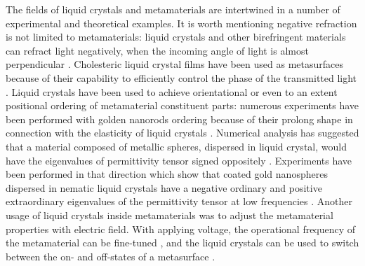 \documentclass[a4paper,11pt]{article}
\begin{document}
The fields of liquid crystals and metamaterials are intertwined in a number of experimental and theoretical examples. 
It is worth mentioning negative refraction is not limited to metamaterials: liquid crystals and other birefringent materials can refract light negatively, when the incoming angle of light is almost perpendicular \cite{lavrentovich-2006-lc-neg}.
Cholesteric liquid crystal films have been used as metasurfaces because of their capability to efficiently control the phase of the transmitted light \cite{ozaki-2016-patterned-lc}.
Liquid crystals have been used to achieve orientational or even to an extent positional ordering of metamaterial constituent parts: numerous experiments have been performed with golden nanorods ordering because of their prolong shape in connection with the elasticity of liquid crystals \cite{lavrentovich-2008-gold-nanorods,smalyukh-2010-self-alignment,lavrentovich-2009-nanorods}. 
Numerical analysis has suggested that a material composed of metallic spheres, dispersed in liquid crystal, would have the eigenvalues of permittivity tensor signed oppositely \cite{xuan-2013-nanoparticle-lc,khoo-2014-nanoparticle-lc}. 
Experiments have been performed in that direction which show that coated gold nanospheres dispersed in nematic liquid crystals have a negative ordinary and positive extraordinary eigenvalues of the permittivity tensor at low frequencies \cite{goodby-2011-lc-gold-mtm}. 
Another usage of liquid crystals inside metamaterials was to adjust the metamaterial properties with electric field. 
With applying voltage, the operational frequency of the metamaterial can be fine-tuned \cite{zhang-2007-lc-mtm-tuning,shalaev-2007-tunable-lc,baets-2011-ring-resonators}, and the liquid crystals can be used to switch between the on- and off-states of a metasurface \cite{buchnev-2015-lc-mtm-switch}. 
\end{document}
